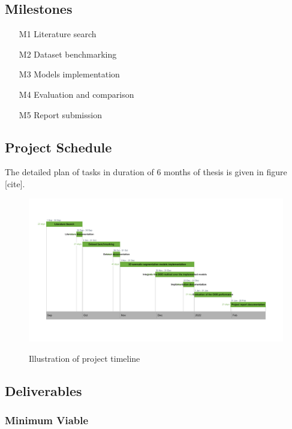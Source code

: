 \documentclass[thesis]{mas_proposal}
\begin{document}
\subsection{Milestones}
\begin{enumerate}
    \item[M1] Literature search
    \item[M2] Dataset benchmarking
    \item[M3] Models implementation
    \item[M4] Evaluation and comparison
    \item[M5] Report submission
\end{enumerate}

\subsection{Project Schedule}
The detailed plan of tasks in duration of 6 months of thesis is given in figure [cite].

\begin{figure}[h!]
    \centering
    \caption{Illustration of project timeline}
    \includegraphics[scale=0.16]{images/rnd_deliverable_timeline}
    \label{fig:schedl}
\end{figure}

\subsection{Deliverables}
\subsubsection*{Minimum Viable}
\end{document}
